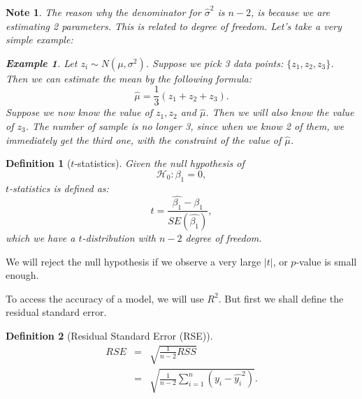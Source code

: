 \documentclass{article}
\theoremstyle{MyNonumberplain}
\theoremstyle{break}
\newcommand{\bt}[1]{\beta_{#1}}
\theoremstyle{break}
\newtheorem{example}{Example}[section]
\newtheorem{note}{Note}
\theoremstyle{break}
\theoremstyle{break}
\newtheorem{definition}{Definition}[section]
\begin{document}
\begin{notebox}
    \begin{note}
        The reason why the denominator for $\hat{\sigma}^2$ is $n-2$, is because we are estimating 2 parameters. This is related to degree of freedom.
        Let's take a very simple example:
        \begin{expbox}
            \begin{example}
                Let $z_i\sim N(\mu,\sigma^2)$. Suppose we pick 3 data points: $\{z_1,z_2,z_3\}$. Then we can estimate the mean by the following formula:
                $$\hat{\mu}=\frac{1}{3}(z_1+z_2+z_3).$$
                Suppose we now know the value of $z_1,z_2$ and $\hat\mu$. Then we will also know the value of $z_3$. The number of sample is no longer 3, since
                when we know 2 of them, we immediately get the third one, with the constraint of the value of $\hat\mu$.
            \end{example}
        \end{expbox}
    \end{note}
\end{notebox}

\begin{defbox}
    \begin{definition}[$t$-statistics]
        Given the null hypothesis of 
        $$\mathcal{H}_0:\bt{1}=0,$$
        $t$-statistics is defined as:
        $$t=\frac{\hat{\bt{1}}-{\bt{1}}}{SE(\hat{\bt{1}})},$$
        which we have a $t$-distribution with $n-2$ degree of freedom.

    \end{definition}
\end{defbox}

We will reject the null hypothesis if we observe a very large $|t|$, or $p$-value is small enough.

To access the accuracy of a model, we will use $R^2$. But first we shall define the residual standard error.

\begin{defbox}
    \begin{definition}[Residual Standard Error (RSE)]
        \begin{eqnarray*}
            RSE &=& \sqrt{\frac{1}{n-2}RSS}\\
                &=& \sqrt{\frac{1}{n-2}\sum_{i=1}^n (y_i-\hat{y_i}^2)} .
        \end{eqnarray*}
    \end{definition}
\end{defbox}
\end{document}
